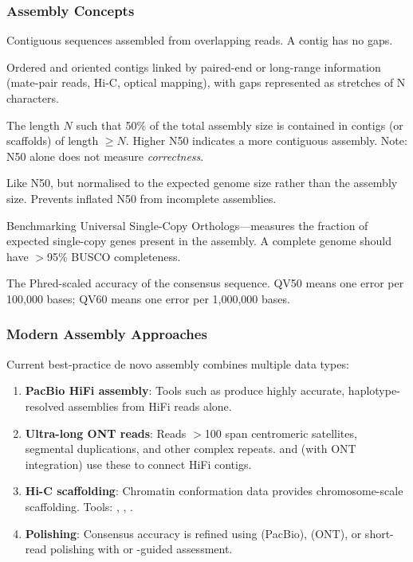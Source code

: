 \subsubsection{Assembly Concepts}

\begin{description}[style=nextline]
  \item[Contigs] Contiguous sequences assembled from overlapping reads. A contig has no gaps.
  \item[Scaffolds] Ordered and oriented contigs linked by paired-end or long-range information (mate-pair reads, Hi-C, optical mapping), with gaps represented as stretches of N characters.
  \item[N50] The length $N$ such that 50\% of the total assembly size is contained in contigs (or scaffolds) of length $\geq N$. Higher N50 indicates a more contiguous assembly. Note: N50 alone does not measure \emph{correctness}.
  \item[NG50] Like N50, but normalised to the expected genome size rather than the assembly size. Prevents inflated N50 from incomplete assemblies.
  \item[BUSCO completeness] Benchmarking Universal Single-Copy Orthologs---measures the fraction of expected single-copy genes present in the assembly. A complete genome should have $>$95\% BUSCO completeness.
  \item[QV (consensus quality)] The Phred-scaled accuracy of the consensus sequence. QV50 means one error per 100,000 bases; QV60 means one error per 1,000,000 bases.
\end{description}

\subsubsection{Modern Assembly Approaches}

Current best-practice de novo assembly combines multiple data types:

\begin{enumerate}[nosep]
  \item \textbf{PacBio HiFi assembly}: Tools such as  produce highly accurate, haplotype-resolved assemblies from HiFi reads alone.
  \item \textbf{Ultra-long ONT reads}: Reads $>$100\kilobase{} span centromeric satellites, segmental duplications, and other complex repeats.  and  (with ONT integration) use these to connect HiFi contigs.
  \item \textbf{Hi-C scaffolding}: Chromatin conformation data provides chromosome-scale scaffolding. Tools: , , .
  \item \textbf{Polishing}: Consensus accuracy is refined using  (PacBio),  (ONT), or short-read polishing with  or -guided assessment.
\end{enumerate}

